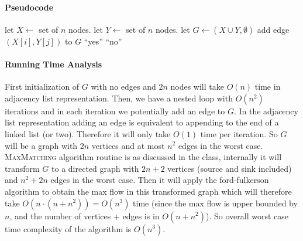 \documentclass[answers]{exam}
\begin{document}
\begin{questions}
\begin{solution}
\paragraph{Pseudocode}
\begin{algorithmic}[1]
    \State let $X \gets $ set of $n$ nodes.
    \State let $Y \gets $ set of $n$ nodes.
    \State let $G \gets (X \cup Y, \emptyset)$
                \State add edge $(X[i], Y[j])$ to $G$
            \EndIf
        \EndFor
    \EndFor
        \State \Return ``yes''
    \Else
        \State \Return ``no''
    \EndIf
\EndFunction
\end{algorithmic}

\paragraph{Running Time Analysis}
First initialization of $G$ with no edges and $2n$ nodes will take $O(n)$ time in adjacency list representation. Then, we have a nested loop with $O(n^2)$ iterations and in each iteration we potentially add an edge to $G$. In the adjacency list representation adding an edge is equivalent to appending to the end of a linked list (or two). Therefore it will only take $O(1)$ time per iteration. So $G$ will be a graph with $2n$ vertices and at most $n^2$ edges in the worst case. \textsc{MaxMatching} algorithm routine is as discussed in the class, internally it will transform $G$ to a directed graph with $2n+2$ vertices (source and sink included) and $n^2 + 2n$ edges in the worst case. Then it will apply the ford-fulkerson algorithm to obtain the max flow in this transformed graph which will therefore take $O(n \cdot (n + n^2)) = O(n^3)$ time (since the max flow is upper bounded by $n$, and the number of vertices + edges is in $O(n + n^2)$). So overall worst case time complexity of the algorithm is $O(n^3)$.
\end{solution}

\newpage















\end{questions}
\end{document}
